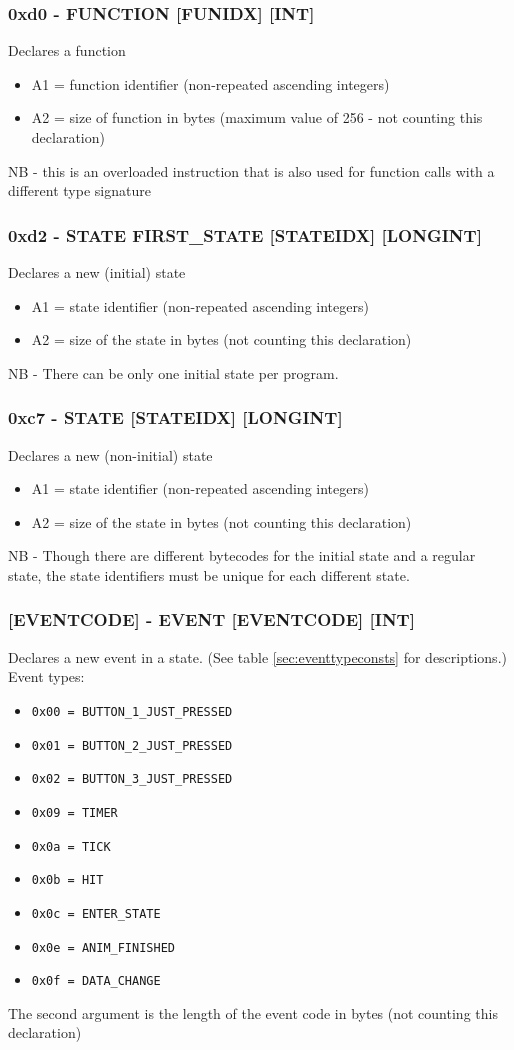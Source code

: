 \documentclass[12pt,a4paper]{scrbook}
\begin{document}
\subsubsection{0xd0 - FUNCTION [FUNIDX] [INT]}
Declares a function
\begin{itemize}
\item A1 = function identifier (non-repeated ascending integers)
\item A2 = size of function in bytes (maximum value of 256 - not counting this declaration)
\end{itemize}
NB - this is an overloaded instruction that is also used for function calls with a different type
signature

\subsubsection{0xd2 - STATE FIRST\_STATE [STATEIDX] [LONGINT]}
Declares a new (initial) state
\begin{itemize}
\item A1 = state identifier (non-repeated ascending integers)
\item A2 = size of the state in bytes (not counting this declaration)
\end{itemize}
NB - There can be only one initial state per program.

\subsubsection{0xc7 - STATE [STATEIDX] [LONGINT]}
Declares a new (non-initial) state
\begin{itemize}
\item A1 = state identifier (non-repeated ascending integers)
\item A2 = size of the state in bytes (not counting this declaration)
\end{itemize}
NB - Though there are different bytecodes for the initial state and a regular state,
the state identifiers must be unique for each different state.

\subsubsection{[EVENTCODE] - EVENT [EVENTCODE] [INT]}
Declares a new event in a state.  (See table \ref{sec:eventtypeconsts} for descriptions.)
Event types:
\begin{itemize}
\item \texttt{0x00 = BUTTON\_1\_JUST\_PRESSED}
\item \texttt{0x01 = BUTTON\_2\_JUST\_PRESSED}
\item \texttt{0x02 = BUTTON\_3\_JUST\_PRESSED}
\item \texttt{0x09 = TIMER}
\item \texttt{0x0a = TICK}
\item \texttt{0x0b = HIT}
\item \texttt{0x0c = ENTER\_STATE}
\item \texttt{0x0e = ANIM\_FINISHED}
\item \texttt{0x0f = DATA\_CHANGE}
\end{itemize}
The second argument is the length of the event code in bytes (not counting this declaration)
\end{document}
